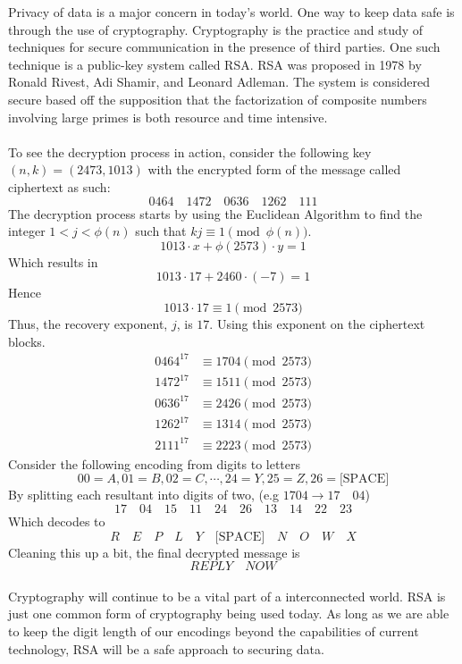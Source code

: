 \documentclass[12pt]{article}
\begin{document}
	Privacy of data is a major concern in today's world. One way to keep data safe is through the use of cryptography. Cryptography is the practice and study of techniques for secure communication in the presence of third parties. One such technique is a public-key system called RSA. RSA was proposed in 1978 by Ronald Rivest, Adi Shamir, and Leonard Adleman. The system is considered secure based off the supposition that the factorization of composite numbers involving large primes is both resource and time intensive. \\
	\\
	To see the decryption process in action, consider the following key $ (n,k)=(2473,1013) $ with the encrypted form of the message called ciphertext as such:
		\[0464\quad1472\quad0636\quad1262\quad111\]
	The decryption process starts by using the Euclidean Algorithm to find the integer $ 1 <j<\phi(n) $ such that $ kj\equiv 1 \pmod{\phi(n)} $.
		\[1013\cdot x+\phi(2573)\cdot y=1\]
	Which results in 
		\[1013\cdot 17 + 2460 \cdot (-7) = 1 \]
	Hence
		\[1013\cdot17 \equiv 1 \pmod{2573}\]
	Thus, the recovery exponent, $ j $, is $ 17 $. Using this exponent on the ciphertext blocks.
		\begin{align*}
			0464^{17} &\equiv 1704 \pmod{2573}\\
		    1472^{17} &\equiv 1511 \pmod{2573}\\
			0636^{17} &\equiv 2426 \pmod{2573}\\
			1262^{17} &\equiv 1314 \pmod{2573}\\
			2111^{17} &\equiv 2223 \pmod{2573}
		\end{align*}
	Consider the following encoding from digits to letters
		\[00 = A, 01=B, 02=C,\cdots ,24=Y,25=Z,26=\text{[SPACE]}\]
	By splitting each resultant into digits of two, (e.g $1704 \rightarrow 17\quad04$)
		\[17\quad04\quad15\quad11\quad24\quad26\quad13\quad14\quad22\quad23\]
	Which decodes to
		\[R\quad E\quad P\quad L\quad Y\quad \text{[SPACE]}\quad N\quad O\quad W \quad X\]
	Cleaning this up a bit, the final decrypted message is
		\[REPLY\quad NOW\]
	\\
	Cryptography will continue to be a vital part of a interconnected world. RSA is just one common form of cryptography being used today. As long as we are able to keep the digit length of our encodings beyond the capabilities of current technology, RSA will be a safe approach to securing data.
\end{document}
